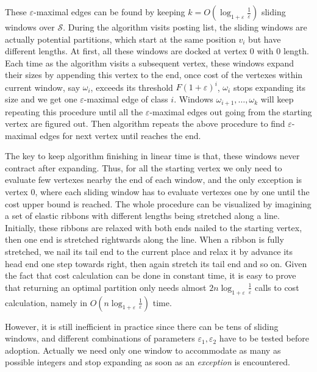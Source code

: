 \documentclass[runningheads]{comsis2}
\begin{document}
These $\varepsilon$-maximal edges can be found by keeping $k = O\left(\log_{1+\varepsilon}\frac{1}{\varepsilon}\right)$ sliding windows over $\mathcal{S}$.
During the algorithm visits posting list, the sliding windows are actually potential partitions, which start at the same position $ v_{i} $ but have different lengths.
At first, all these windows are docked at vertex 0 with 0 length.
Each time as the algorithm visits a subsequent vertex, these windows expand their sizes by appending this vertex to the end, once cost of the vertexes within current window, say $ \omega_{i} $, exceeds its threshold $ F \left( 1 + \varepsilon \right) ^{i} $, $ \omega_{i} $ stops expanding its size and we get one $\varepsilon$-maximal edge of class $ i $.
Windows $ \omega_{i+1}, \dots, \omega_{k}$ will keep repeating this procedure until all the $\varepsilon$-maximal edges out going from the starting vertex are figured out.
Then algorithm repeats the above procedure to find $\varepsilon$-maximal edges for next vertex until reaches the end.

The key to keep algorithm finishing in linear time is that, these windows never contract after expanding.
Thus, for all the starting vertex we only need to evaluate few vertexes nearby the end of each window, and the only exception is vertex 0, where each sliding window has to evaluate vertexes one by one until the cost upper bound is reached.
The whole procedure can be visualized by imagining a set of elastic ribbons with different lengths being stretched along a line.
Initially, these ribbons are relaxed with both ends nailed to the starting vertex, then one end is stretched rightwards along the line.
When a ribbon is fully stretched, we nail its tail end to the current place and relax it by advance its head end one step towards right, then again stretch its tail end and so on.
Given the fact that cost calculation can be done in constant time, it is easy to prove that returning an optimal partition only needs almost $ 2n\log_{1+\varepsilon}\frac{1}{\varepsilon} $ calls to cost calculation, namely in $O\left(n\log_{1+\varepsilon}\frac{1}{\varepsilon}\right)$ time.

However, it is still inefficient in practice since there can be tens of sliding windows, and different combinations of parameters $ \varepsilon_1,\varepsilon_2 $ have to be tested before adoption.
Actually we need only one window to accommodate as many as possible integers and stop expanding as soon as an \textit{exception} is encountered.
\end{document}
